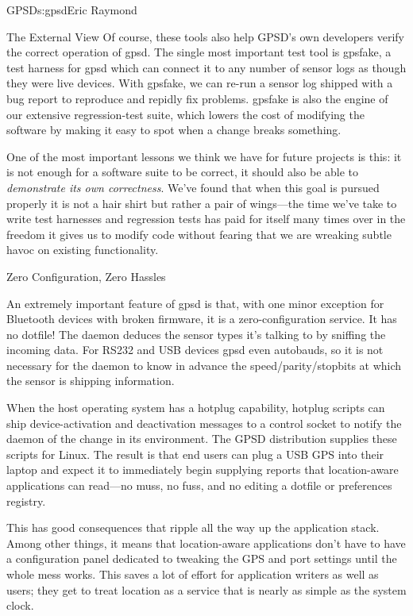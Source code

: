 \begin{aosachapter}{GPSD}{s:gpsd}{Eric Raymond}
\begin{aosasect1}{The External View}
Of course, these tools also help GPSD's own developers verify the
correct operation of gpsd. The single most important test tool is
gpsfake, a test harness for gpsd which can connect it to any number
of sensor logs as though they were live devices.  With gpsfake,
we can re-run a sensor log shipped with a bug report to reproduce
and repidly fix problems.  gpsfake is also the engine of our
extensive regression-test suite, which lowers the cost of modifying
the software by making it easy to spot when a change breaks something.

One of the most important lessons we think we have for future projects
is this: it is not enough for a software suite to be correct, it should
also be able to \emph{demonstrate its own correctness}.  We've found that
when this goal is pursued properly it is not a hair shirt but rather a
pair of wings---the time we've take to write test harnesses and
regression tests has paid for itself many times over in the freedom
it gives us to modify code without fearing that we are wreaking
subtle havoc on existing functionality.

\end{aosasect1}

\begin{aosasect1}{Zero Configuration, Zero Hassles}

An extremely important feature of gpsd is that, with one minor
exception for Bluetooth devices with broken firmware, it is a
zero-configuration service.  It has no dotfile!  The daemon deduces
the sensor types it's talking to by sniffing the incoming data.  For
RS232 and USB devices gpsd even autobauds, so it is not necessary for
the daemon to know in advance the speed/parity/stopbits at which the
sensor is shipping information.

When the host operating system has a hotplug capability, hotplug
scripts can ship device-activation and deactivation messages to a
control socket to notify the daemon of the change in its environment.
The GPSD distribution supplies these scripts for Linux.  The result
is that end users can plug a USB GPS into their laptop and expect
it to immediately begin supplying reports that location-aware
applications can read---no muss, no fuss, and no editing a 
dotfile or preferences registry.

This has good consequences that ripple all the way up the application
stack.  Among other things, it means that location-aware applications
don't have to have a configuration panel dedicated to tweaking the GPS 
and port settings until the whole mess works. This saves a lot of 
effort for application writers as well as users; they get to treat
location as a service that is nearly as simple as the system clock.


\end{aosasect1}
\end{aosachapter}
